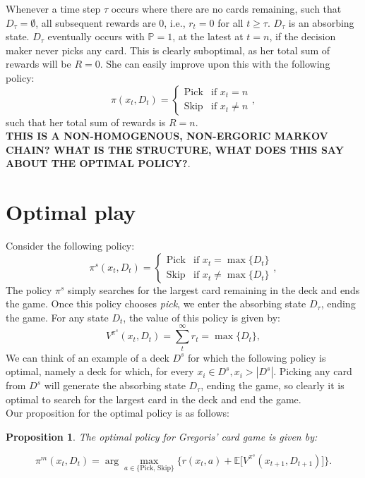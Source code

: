 \documentclass{article}
\newtheorem{proposition}[theorem]{Proposition}
\begin{document}
Whenever a time step $\tau$ occurs where there are no cards remaining, such that $D_\tau = \emptyset$, all subsequent rewards are $0$, i.e., $r_t=0$ for all $t \geq \tau$. $D_\tau$ is an absorbing state.
$D_\tau$ eventually occurs with $\mathbb{P}=1$, at the latest at $t=n$, if the decision maker never picks any card. This is clearly suboptimal, as her total sum of rewards will be $R=0$. She can easily improve upon this with the following policy:
\begin{equation}
    \pi(x_t, D_t) = \begin{cases}
        \text{Pick} & \text{if } x_t = n    \\
        \text{Skip} & \text{if } x_t \neq n
    \end{cases},
\end{equation}
such that her total sum of rewards is $R=n$.\\

\textbf{THIS IS A NON-HOMOGENOUS, NON-ERGORIC MARKOV CHAIN? WHAT IS THE STRUCTURE, WHAT DOES THIS SAY ABOUT THE OPTIMAL POLICY?}.

\section{Optimal play}
Consider the following policy:
\begin{equation}
    \pi^s(x_t, D_t) = \begin{cases}
        \text{Pick} & \text{if } x_t = \max\{D_t\}    \\
        \text{Skip} & \text{if } x_t \neq \max\{D_t\}
    \end{cases},
\end{equation}
The policy $\pi^s$ simply searches for the largest card remaining in the deck and ends the game. Once this policy chooses \textit{pick}, we enter the absorbing state $D_\tau$, ending the game. For any state $D_t$, the value of this policy is given by:
\begin{equation}
    V^{\pi^s}(x_t, D_t)= \sum^\infty_t r_t = \max\{D_t\},
\end{equation}
We can think of an example of a deck $D^s$ for which the following policy is optimal, namely a deck for which, for every $x_i \in D^s, x_i > |D^s|$. Picking any card from $D^s$ will generate the absorbing state $D_\tau$, ending the game, so clearly it is optimal to search for the largest card in the deck and end the game.\\

Our proposition for the optimal policy is as follows:
\begin{proposition}
    The optimal policy for Gregoris' card game is given by:

    \begin{equation}
        \pi^m(x_t, D_t) = \arg \max_{a \in \{\text{Pick, Skip}\}}\Big\{r(x_t,a) + \mathbb{E}\Big[V^{\pi^s}(x_{t+1}, D_{t+1})\Big]\Big\}.
    \end{equation}
\end{proposition}
\end{document}
